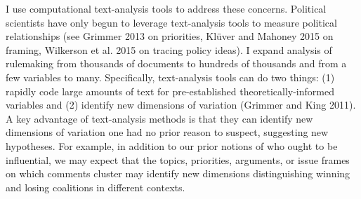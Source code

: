 I use computational text-analysis tools to address these concerns. Political scientists have only begun to leverage text-analysis tools to measure political relationships (see Grimmer 2013 on priorities, Kl\"uver and Mahoney 2015 on framing, Wilkerson et al. 2015 on tracing policy ideas). I expand analysis of rulemaking from thousands of documents to hundreds of thousands and from a few variables to many. Specifically, text-analysis tools can do two things: (1) rapidly code large amounts of text for pre-established theoretically-informed variables and (2) identify new dimensions of variation (Grimmer and King 2011). A key advantage of text-analysis methods is that they can identify new dimensions of variation one had no prior reason to suspect, suggesting new hypotheses. For example, in addition to our prior notions of who ought to be influential, we may expect that the topics, priorities, arguments, or issue frames on which comments cluster may identify new dimensions distinguishing winning and losing coalitions in different contexts.  %



